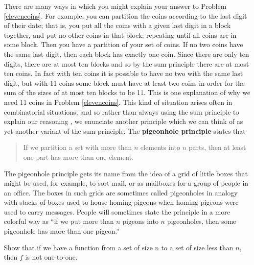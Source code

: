 There are many ways in which you might explain your answer to Problem
\ref{elevencoins}.  For example, you can partition the coins according to the
last digit of their date; that is, you put all the coins with a given last
digit in a block together, and put no other coins in that block; repeating
until all coins are in some block.  Then you have a partition of your set of
coins.  If no two coins have the same last digit, then each block has exactly
one coin.  Since there are only ten digits, there are at most ten blocks and
so by the sum principle there are at most ten coins. In fact with ten coins
it is possible to have no two with the same last digit, but with 11 coins
some block must have at least two coins in order for the sum of the sizes of
at most ten blocks to be 11.  This is one explanation of why we need 11
coins in Problem \ref{elevencoins}.  This kind of situation arises often in
combinatorial situations, and so rather than always using the sum principle
to explain our reasoning , we enunciate another principle which we can think
of as yet another variant of the sum principle.  The {\bf pigeonhole
principle} states that
\begin{quote} If we partition a set with more than $n$ elements into 
$n$ parts, then at least one part has more than one element.\end{quote}  The
pigeonhole principle gets its name from the idea of a grid of little boxes
that might be used, for example, to sort mail, or as mailboxes for a group of
people in an office.  The boxes in such grids are sometimes called
pigeonholes in analogy with stacks of boxes used to house homing pigeons when
homing pigeons were used to carry messages.  People will sometimes state the
principle in a more colorful way as ``if we put more than $n$ pigeons into
$n$ pigeonholes, then some pigeonhole has more than one pigeon.''

\bp 
\item Show that if we have a function from a set of size $n$ to a set of
size less than $n$, then $f$ is not one-to-one.

